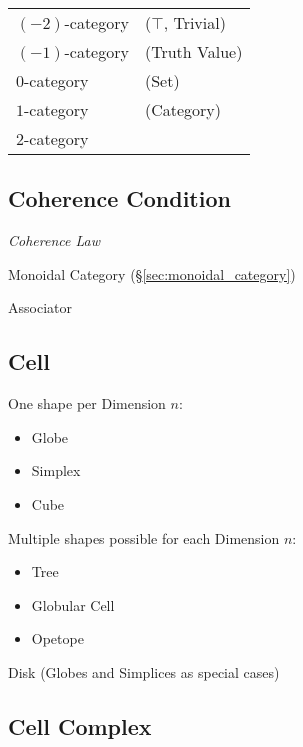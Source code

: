 \begin{tabular}{l l}
  $(-2)$-category   & ($\top$, Trivial) \\
  $(-1)$-category   & (Truth Value) \\
  $0$-category      & (Set) \\
  $1$-category      & (Category) \\
  $2$-category      & \\
\end{tabular}



\subsection{Coherence Condition}\label{sec:coherence_condition}

\emph{Coherence Law}

Monoidal Category (\S\ref{sec:monoidal_category})

Associator



\subsection{Cell}\label{sec:cell}

One shape per Dimension $n$:
\begin{itemize}
  \item Globe
  \item Simplex
  \item Cube
\end{itemize}

Multiple shapes possible for each Dimension $n$:
\begin{itemize}
  \item Tree
  \item Globular Cell
  \item Opetope
\end{itemize}

Disk (Globes and Simplices as special cases)



\subsection{Cell Complex}\label{sec:cell_complex}

